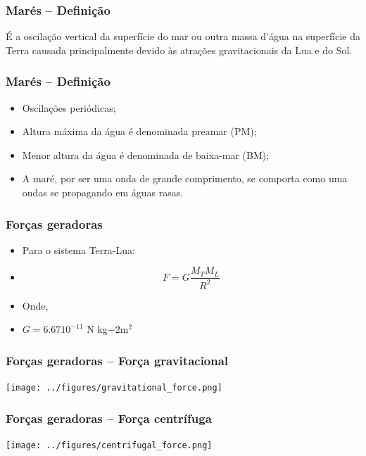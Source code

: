 \begin{frame}
  \frametitle{Marés -- Definição}
  \begin{center}
  \begin{block}{}
      É a oscilação vertical da superfície do mar ou outra massa d'água
      na superfície da Terra causada principalmente devido às atrações
      gravitacionais da Lua e do Sol.
  \end{block}
  \end{center}
\end{frame}

\begin{frame}
  \frametitle{Marés -- Definição}
    \begin{itemize}[<+-| alert@+>]
      \item Oscilações periódicas;
      \item Altura máxima da água é denominada preamar (PM);
      \item Menor altura da água é denominada de baixa-mar (BM);
      \item A maré, por ser uma onda de grande comprimento, se comporta como
            uma ondas se propagando em águas rasas.
    \end{itemize}
\end{frame}

\begin{frame}
  \frametitle{Forças geradoras}
    \begin{itemize}[<+-| alert@+>]
      \item Para o sistema Terra-Lua:
      \item \[F = G\frac{M_TM_L}{R^2}\]
      \item Onde,
      \item $G = 6.67 10^{-11}$ N kg${-2}$m$^{2}$
    \end{itemize}
\end{frame}


\begin{frame}
  \frametitle{Forças geradoras -- Força gravitacional}
  \begin{center}
    \texttt{[image: ../figures/gravitational\_force.png]}
  \end{center}
\end{frame}


\begin{frame}
  \frametitle{Forças geradoras -- Força centrífuga}
  \begin{center}
    \texttt{[image: ../figures/centrifugal\_force.png]}
  \end{center}
\end{frame}

